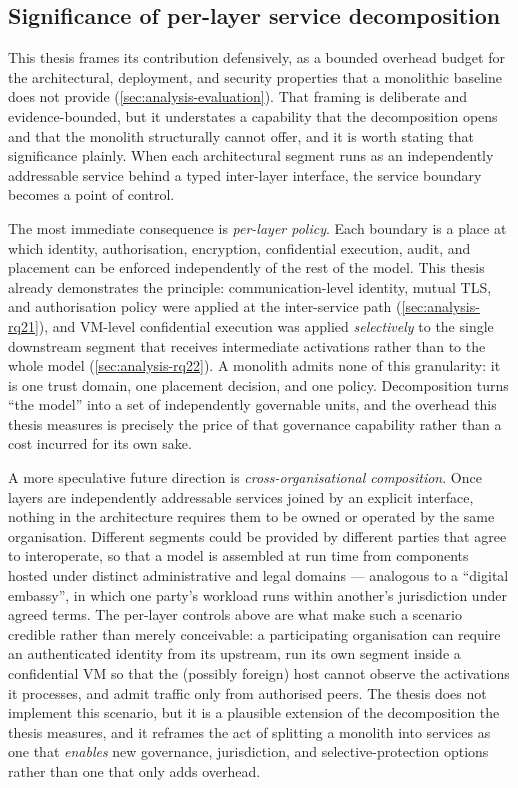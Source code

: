\subsection{Significance of per-layer service decomposition}
\label{sec:analysis-impact}

This thesis frames its contribution defensively, as a bounded overhead budget for
the architectural, deployment, and security properties that a monolithic baseline
does not provide (\cref{sec:analysis-evaluation}). That framing is deliberate and
evidence-bounded, but it understates a capability that the decomposition opens and
that the monolith structurally cannot offer, and it is worth stating that
significance plainly. When each architectural segment runs as an independently
addressable service behind a typed inter-layer interface, the service boundary
becomes a point of control.

The most immediate consequence is \emph{per-layer policy}. Each boundary is a
place at which identity, authorisation, encryption, confidential execution, audit,
and placement can be enforced independently of the rest of the model. This thesis
already demonstrates the principle: communication-level identity, mutual TLS, and
authorisation policy were applied at the inter-service path
(\cref{sec:analysis-rq21}), and VM-level confidential execution was applied
\emph{selectively} to the single downstream segment that receives intermediate
activations rather than to the whole model (\cref{sec:analysis-rq22}). A monolith
admits none of this granularity: it is one trust domain, one placement decision,
and one policy. Decomposition turns ``the model'' into a set of independently
governable units, and the overhead this thesis measures is precisely the price of
that governance capability rather than a cost incurred for its own sake.

A more speculative future direction is \emph{cross-organisational
composition}. Once layers are independently addressable services joined by an
explicit interface, nothing in the architecture requires them to be owned or
operated by the same organisation. Different segments could be provided by
different parties that agree to interoperate, so that a model is assembled at run
time from components hosted under distinct administrative and legal domains ---
analogous to a ``digital embassy'', in which one party's workload runs within
another's jurisdiction under agreed terms. The per-layer controls above are what
make such a scenario credible rather than merely conceivable: a participating
organisation can require an authenticated identity from its upstream, run its own
segment inside a confidential VM so that the (possibly foreign) host cannot
observe the activations it processes, and admit traffic only from authorised
peers. The thesis does not implement this scenario, but it is a plausible extension
of the decomposition the thesis measures, and it reframes the act of splitting a
monolith into services as one that \emph{enables} new governance, jurisdiction,
and selective-protection options rather than one that only adds overhead.

